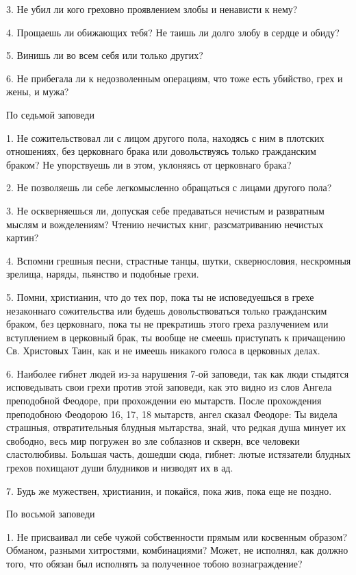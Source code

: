 3. Не убил ли кого греховно проявлением злобы и ненависти к нему?

4. Прощаешь ли обижающих тебя? Не таишь ли долго злобу в сердце и обиду?

5. Винишь ли во всем себя или только других?

6. Не прибегала ли к недозволенным операциям, что тоже есть убийство, грех и жены, и мужа? 

\bfseries \itshape 

По седьмой заповеди

\normalfont{}\normalfont{}1. Не сожительствовал ли с лицом другого пола, находясь с ним в плотских отношениях, без церковнаго брака или довольствуясь только гражданским браком? Не упорствуешь ли в этом, уклоняясь от церковнаго брака?

2. Не позволяешь ли себе легкомысленно обращаться с лицами другого пола?

3. Не оскверняешься ли, допуская себе предаваться нечистым и развратным мыслям и вожделениям? Чтению нечистых книг, разсматриванию нечистых картин?

4. Вспомни грешныя песни, страстные танцы, шутки, сквернословия, нескромныя зрелища, наряды, пьянство и подобные грехи.

5. Помни, христианин, что до тех пор, пока ты не исповедуешься в грехе незаконнаго сожительства или будешь довольствоваться только гражданским браком, без церковнаго, пока ты не прекратишь этого греха разлучением или вступлением в церковный брак, ты вообще не смеешь приступать к причащению Св. Христовых Таин, как и не имеешь никакого голоса в церковных делах.

6. Наиболее гибнет людей из-за нарушения 7-ой заповеди, так как люди стыдятся исповедывать свои грехи против этой заповеди, как это видно из слов Ангела преподобной Феодоре, при прохождении ею мытарств. После прохождения преподобною Феодорою 16, 17, 18 мытарств, ангел сказал Феодоре: Ты видела страшныя, отвратительныя блудныя мытарства, знай, что редкая душа минует их свободно, весь мир погружен во зле соблазнов и скверн, все человеки сластолюбивы. Большая часть, дошедши сюда, гибнет: лютые истязатели блудных грехов похищают души блудников и низводят их в ад.

7. Будь же мужествен, христианин, и покайся, пока жив, пока еще не поздно. 

\bfseries \itshape 

По восьмой заповеди

\normalfont{}\normalfont{}1. Не присваивал ли себе чужой собственности прямым или косвенным образом? Обманом, разными хитростями, комбинациями? Может, не исполнял, как должно того, что обязан был исполнять за полученное тобою вознаграждение?

